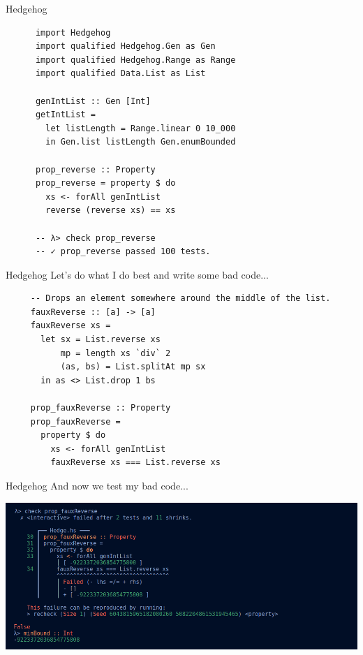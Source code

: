   \begin{frame}[fragile]{Hedgehog}
      \begin{verbatim}
      import Hedgehog
      import qualified Hedgehog.Gen as Gen
      import qualified Hedgehog.Range as Range
      import qualified Data.List as List
     
      genIntList :: Gen [Int]
      getIntList =
        let listLength = Range.linear 0 10_000
        in Gen.list listLength Gen.enumBounded
      
      prop_reverse :: Property
      prop_reverse = property $ do
        xs <- forAll genIntList
        reverse (reverse xs) == xs
      
      -- λ> check prop_reverse
      -- ✓ prop_reverse passed 100 tests.
      \end{verbatim}
  \end{frame}
 
  \begin{frame}[fragile]{Hedgehog}
     Let's do what I do best and write some bad code...
     \begin{verbatim}
     -- Drops an element somewhere around the middle of the list.
     fauxReverse :: [a] -> [a]
     fauxReverse xs =
       let sx = List.reverse xs
           mp = length xs `div` 2
           (as, bs) = List.splitAt mp sx
       in as <> List.drop 1 bs

     prop_fauxReverse :: Property
     prop_fauxReverse =
       property $ do
         xs <- forAll genIntList
         fauxReverse xs === List.reverse xs
     \end{verbatim}
  \end{frame}
    
  \begin{frame}[fragile]{Hedgehog}
     And now we test my bad code...
     \begin{center}
     \includegraphics[width= 1.0\textwidth]{images/hedgehog_faux_reverse_output.png}
     \end{center}
  \end{frame}
  
